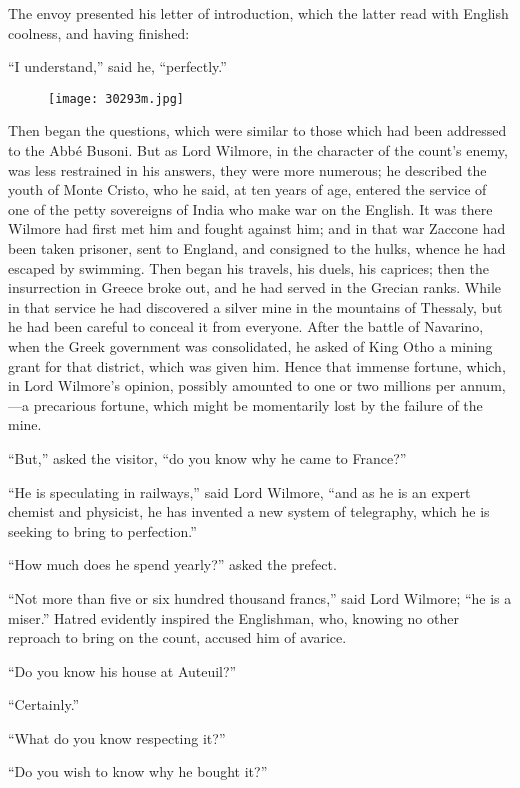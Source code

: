 The envoy presented his letter of introduction, which the latter read
with English coolness, and having finished:

“I understand,” said he, “perfectly.”

\begin{figure}[ht]
\texttt{[image: 30293m.jpg]}
\end{figure}

Then began the questions, which were similar to those which had been
addressed to the Abbé Busoni. But as Lord Wilmore, in the character of
the count’s enemy, was less restrained in his answers, they were more
numerous; he described the youth of Monte Cristo, who he said, at ten
years of age, entered the service of one of the petty sovereigns of
India who make war on the English. It was there Wilmore had first met
him and fought against him; and in that war Zaccone had been taken
prisoner, sent to England, and consigned to the hulks, whence he had
escaped by swimming. Then began his travels, his duels, his caprices;
then the insurrection in Greece broke out, and he had served in the
Grecian ranks. While in that service he had discovered a silver mine in
the mountains of Thessaly, but he had been careful to conceal it from
everyone. After the battle of Navarino, when the Greek government was
consolidated, he asked of King Otho a mining grant for that district,
which was given him. Hence that immense fortune, which, in Lord
Wilmore’s opinion, possibly amounted to one or two millions per
annum,—a precarious fortune, which might be momentarily lost by the
failure of the mine.

“But,” asked the visitor, “do you know why he came to France?”

“He is speculating in railways,” said Lord Wilmore, “and as he is an
expert chemist and physicist, he has invented a new system of
telegraphy, which he is seeking to bring to perfection.”

“How much does he spend yearly?” asked the prefect.

“Not more than five or six hundred thousand francs,” said Lord Wilmore;
“he is a miser.” Hatred evidently inspired the Englishman, who, knowing
no other reproach to bring on the count, accused him of avarice.

“Do you know his house at Auteuil?”

“Certainly.”

“What do you know respecting it?”

“Do you wish to know why he bought it?”

